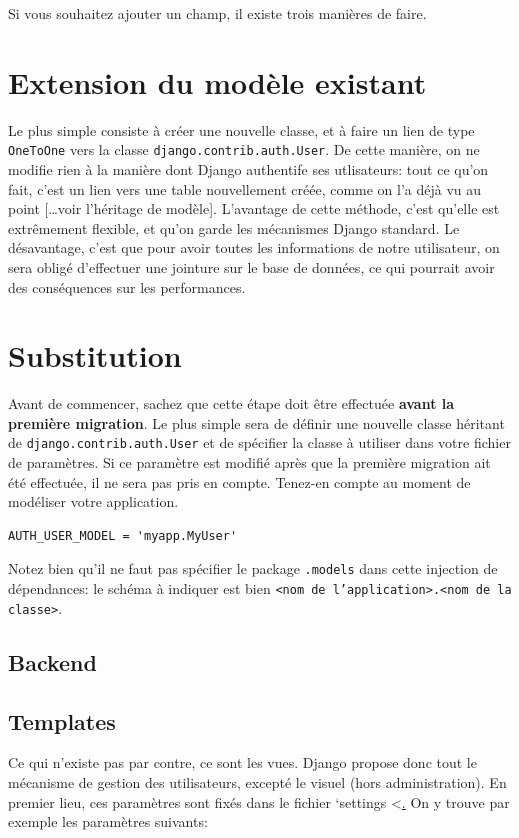 \documentclass[11pt]{amsbook}
\begin{document}
Si vous souhaitez ajouter un champ, il existe trois manières de faire.


\hypertarget{x-extension-du-modèle-existant}{\section{Extension du modèle existant}}
Le plus simple consiste à créer une nouvelle classe, et à faire un lien de type \texttt{OneToOne} vers la classe \texttt{django.contrib.auth.User}. De cette manière, on ne modifie rien à la manière dont Django authentife ses utlisateurs: tout ce qu’on fait, c’est un lien vers une table nouvellement créée, comme on l’a déjà vu au point […​voir l’héritage de modèle]. L’avantage de cette méthode, c’est qu’elle est extrêmement flexible, et qu’on garde les mécanismes Django standard. Le désavantage, c’est que pour avoir toutes les informations de notre utilisateur, on sera obligé d’effectuer une jointure sur le base de données, ce qui pourrait avoir des conséquences sur les performances.


\hypertarget{x-substitution}{\section{Substitution}}
Avant de commencer, sachez que cette étape doit être effectuée \textbf{avant la première migration}. Le plus simple sera de définir une nouvelle classe héritant de \texttt{django.contrib.auth.User} et de spécifier la classe à utiliser dans votre fichier de paramètres. Si ce paramètre est modifié après que la première migration ait été effectuée, il ne sera pas pris en compte. Tenez-en compte au moment de modéliser votre application.


\begin{verbatim}
AUTH_USER_MODEL = 'myapp.MyUser'
\end{verbatim}

Notez bien qu’il ne faut pas spécifier le package \texttt{.models} dans cette injection de dépendances: le schéma à indiquer est bien \texttt{<nom de l’application>.<nom de la classe>}.


\hypertarget{x-backend}{\subsection{Backend}}

\hypertarget{x-templates}{\subsection{Templates}}
Ce qui n’existe pas par contre, ce sont les vues. Django propose donc tout le mécanisme de gestion des utilisateurs, excepté le visuel (hors administration). En premier lieu, ces paramètres sont fixés dans le fichier `settings <\href{https://docs.djangoproject.com/en/1.8/ref/settings/auth}. On y trouve par exemple les paramètres suivants:
\end{document}
